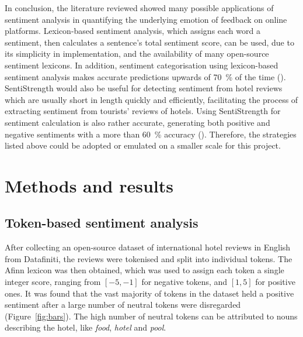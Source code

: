 \documentclass[11pt, a4paper]{pancake-article}
\begin{document}
In conclusion, the literature reviewed showed many possible applications
of sentiment analysis in quantifying the underlying emotion of feedback
on online platforms. Lexicon-based sentiment analysis, which assigns each
word a sentiment, then calculates a sentence's total sentiment score, can
be used, due to its simplicity in implementation, and the availability of
many open-source sentiment lexicons. In addition, sentiment categorisation
using lexicon-based sentiment analysis makes accurate predictions upwards of
\qty{70}{\percent} of the time (\cite{khoo}). SentiStrength would
also be useful for
detecting sentiment from hotel reviews which are usually short in length quickly
and efficiently, facilitating the process of extracting sentiment from tourists'
reviews of hotels. Using SentiStrength for sentiment calculation is also
rather accurate, generating both positive and negative sentiments with a more
than \qty{60}{\percent} accuracy (\cite{thelwall}). Therefore, the
strategies listed
above could be adopted or emulated on a smaller scale for this project.

\section{Methods and results}

\subsection{Token-based sentiment analysis}\label{sec:tokens}
After collecting an open-source dataset of international hotel
reviews in English from Datafiniti,
the reviews were tokenised and split into individual tokens. The
Afinn lexicon was then obtained,
which was used to assign each token a single integer score, ranging
from \(\left[-5, -1\right]\) for
negative tokens, and \(\left[1, 5\right]\) for positive ones. It was
found that the vast majority
of tokens in the dataset held a positive sentiment  after a large
number of neutral tokens were disregarded
(Figure~\ref{fig:bars}). The high number of neutral tokens can be
attributed to nouns
describing the hotel, like \textit{food}, \textit{hotel} and \textit{pool}.
\end{document}
